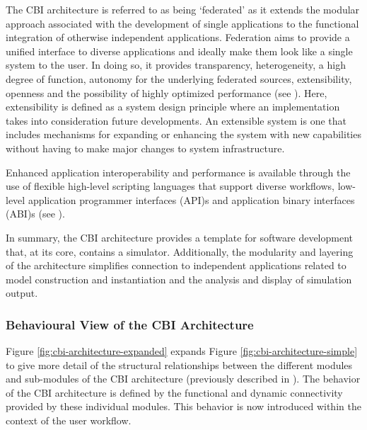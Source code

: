 \documentclass[11pt,3p,twocolumn]{JMN}
\begin{document}
The CBI architecture is referred to as being `federated' as it extends
the modular approach associated with the development of single
applications to the functional integration of otherwise independent
applications.  Federation aims to provide a unified interface to
diverse applications and ideally make them look like a single
system to the user. In doing so, it provides transparency, heterogeneity, a high
degree of function, autonomy for the underlying federated sources,
extensibility, openness and the possibility of highly optimized
performance (see \cite{federated-2002-xyz}). Here, extensibility is defined as a system design
principle where an implementation takes into consideration future
developments. An extensible system is one that includes mechanisms for
expanding or enhancing the system with new capabilities without having
to make major changes to system infrastructure. 

Enhanced application interoperability and performance is available
through the use of flexible high-level scripting languages that support
diverse workflows, low-level application programmer interfaces
(API)s and application binary interfaces (ABI)s (see \cite{Cornelis:2011fk}).


In summary, the CBI architecture provides a template for software
development that, at its core, contains a simulator.  Additionally,
the modularity and layering of the architecture simplifies connection
to independent applications related to model construction
and instantiation and the analysis and display of simulation output.

\subsubsection{Behavioural View of the CBI Architecture}

Figure \ref{fig:cbi-architecture-expanded} expands Figure \ref{fig:cbi-architecture-simple} to give more
detail of the structural relationships between the different modules and
sub-modules of the CBI architecture (previously described in \cite{cornelis12}). The behavior of
the CBI architecture is defined by the functional and dynamic
connectivity provided by these individual modules. This behavior is now introduced within the context of the user workflow.
\end{document}
